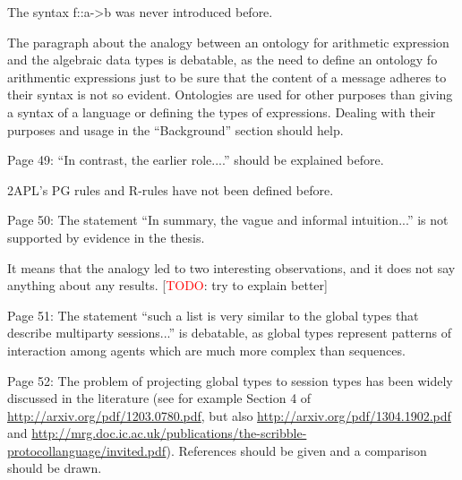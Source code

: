 \documentclass{article}
\newcommand{\todo}[1]{[\textcolor{red}{TODO}: #1]}
\newenvironment{them}{\noindent\begingroup\color{blue}}{\endgroup\par}
\begin{document}
\begin{them}

The syntax f::a->b was never introduced before.
\end{them}
\todo{?}

\begin{them}

The paragraph about the analogy between an ontology for arithmetic expression and the algebraic data types is debatable, as the need to define an ontology fo arithmentic expressions just to be sure that the content of a message adheres to their syntax is not so evident. Ontologies are used for other purposes than giving a syntax of a language or defining the types of expressions. Dealing with their purposes and usage in the “Background” section should help.
\end{them}
\todo{?}

\begin{them}

Page 49:
“In contrast, the earlier role....” should be explained before.
\end{them}
\todo{?}

\begin{them}

2APL's PG rules and R-rules have not been defined before.
\end{them}
\todo{define 2APL's rules}

\begin{them}

Page 50:
The statement “In summary, the vague and informal intuition...” is not supported by evidence in the thesis.
\end{them}
It means that the analogy led to two interesting observations, and it does not say anything about any results.
\todo{try to explain better}

\begin{them}

Page 51:
The statement “such a list is very similar to the global types that describe multiparty sessions...” is debatable, as global types represent patterns of interaction among agents which are much more complex than sequences.
\end{them}
\todo{?}

\begin{them}

Page 52:
The problem of projecting global types to session types has been widely discussed in the literature (see for example Section 4 of \url{http://arxiv.org/pdf/1203.0780.pdf}, but also \url{http://arxiv.org/pdf/1304.1902.pdf} and \url{http://mrg.doc.ic.ac.uk/publications/the-scribble-protocollanguage/invited.pdf}).
References should be given and a comparison should be drawn.
\end{them}
\todo{?}
\end{document}
